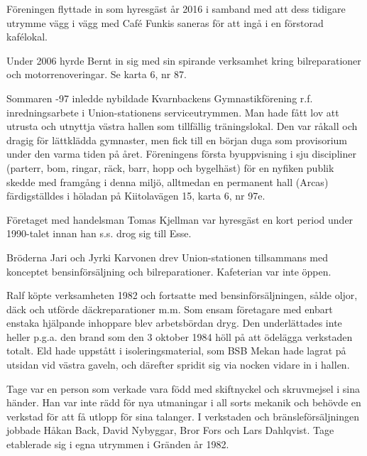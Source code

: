 
Föreningen flyttade in som hyresgäst år 2016 i samband med att dess tidigare utrymme vägg i vägg med Café Funkis saneras för att	ingå i en förstorad kafélokal.


Under 2006 hyrde Bernt in sig med sin spirande verksamhet kring bilreparationer och motorrenoveringar. Se karta 6, nr 87.


Sommaren -97 inledde nybildade Kvarnbackens Gymnastikförening r.f. inredningsarbete i Union-stationens serviceutrymmen. Man hade fått lov att utrusta och utnyttja västra hallen som tillfällig träningslokal. Den var råkall och dragig för lättklädda gymnaster, men fick till en början duga som provisorium under den varma tiden på året. Föreningens första	byuppvisning i sju discipliner (parterr, bom, ringar, räck, barr, hopp 	och bygelhäst) för en nyfiken publik skedde med framgång i denna miljö, alltmedan en permanent hall (Arcas) färdigställdes i höladan på Kiitolavägen 15, karta 6, nr 97e.


Företaget med handelsman Tomas Kjellman var hyresgäst en kort period under 1990-talet innan han s.s. drog sig till Esse.


Bröderna Jari och Jyrki Karvonen drev Union-stationen tillsammans med konceptet bensinförsäljning och bilreparationer. Kafeterian var inte öppen.


Ralf köpte verksamheten 1982 och fortsatte med bensinförsäljningen, sålde oljor, däck och utförde däckreparationer m.m. Som ensam företagare med enbart enstaka hjälpande inhoppare blev arbetsbördan dryg.	Den underlättades inte heller p.g.a. den brand som den 3 oktober	1984 höll på att ödelägga verkstaden totalt. Eld hade uppstått i isoleringsmaterial, som BSB Mekan hade lagrat på utsidan vid västra	gaveln, och därefter spridit sig via nocken vidare in i hallen.


Tage var en person som verkade vara född med skiftnyckel och skruvmejsel i sina händer. Han var inte rädd för nya utmaningar i all sorts mekanik och behövde en verkstad för att få utlopp för sina talanger. I verkstaden och bränsleförsäljningen jobbade Håkan Back, David 	Nybyggar, Bror Fors och Lars Dahlqvist. Tage etablerade sig i egna 	utrymmen i Gränden år 1982.



